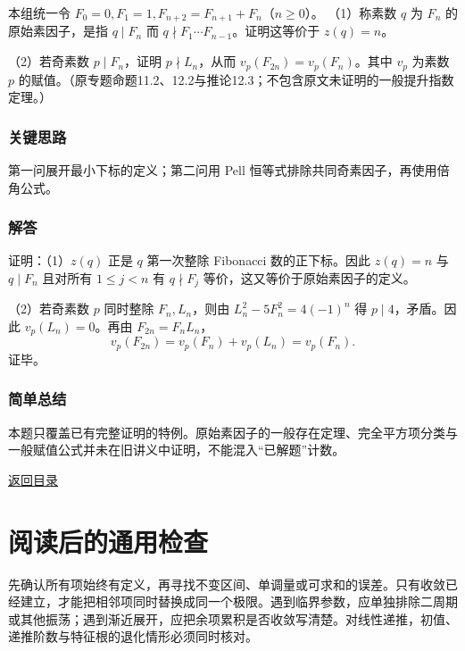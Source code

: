 \documentclass[11pt,a4paper]{article}
\begin{document}
本组统一令 \(F_0=0,F_1=1,F_{n+2}=F_{n+1}+F_n\)（\(n\ge0\)）。
（1）称素数 \(q\) 为 \(F_n\) 的原始素因子，是指 \(q\mid F_n\) 而
\(q\nmid F_1\cdots F_{n-1}\)。证明这等价于 \(z(q)=n\)。

（2）若奇素数 \(p\mid F_n\)，证明 \(p\nmid L_n\)，从而
\(v_p(F_{2n})=v_p(F_n)\)。其中 \(v_p\) 为素数 \(p\)
的赋值。（原专题命题11.2、12.2与推论12.3；不包含原文未证明的一般提升指数定理。）

\subsubsection{关键思路}\label{ux5173ux952eux601dux8def-46}

第一问展开最小下标的定义；第二问用 Pell
恒等式排除共同奇素因子，再使用倍角公式。

\subsubsection{解答}\label{ux89e3ux7b54-46}

证明：（1）\(z(q)\) 正是 \(q\) 第一次整除 Fibonacci 数的正下标。因此
\(z(q)=n\) 与 \(q\mid F_n\) 且对所有 \(1\le j<n\) 有 \(q\nmid F_j\)
等价，这又等价于原始素因子的定义。

（2）若奇素数 \(p\) 同时整除 \(F_n,L_n\)，则由 \(L_n^2-5F_n^2=4(-1)^n\)
得 \(p\mid4\)，矛盾。因此 \(v_p(L_n)=0\)。再由 \(F_{2n}=F_nL_n\)，
\[v_p(F_{2n})=v_p(F_n)+v_p(L_n)=v_p(F_n).\] 证毕。

\subsubsection{简单总结}\label{ux7b80ux5355ux603bux7ed3-46}

本题只覆盖已有完整证明的特例。原始素因子的一般存在定理、完全平方项分类与一般赋值公式并未在旧讲义中证明，不能混入``已解题''计数。

\noindent\hyperref[contents]{返回目录}

\section{阅读后的通用检查}\label{ux9605ux8bfbux540eux7684ux901aux7528ux68c0ux67e5}

先确认所有项始终有定义，再寻找不变区间、单调量或可求和的误差。只有收敛已经建立，才能把相邻项同时替换成同一个极限。遇到临界参数，应单独排除二周期或其他振荡；遇到渐近展开，应把余项累积是否收敛写清楚。对线性递推，初值、递推阶数与特征根的退化情形必须同时核对。
\end{document}
